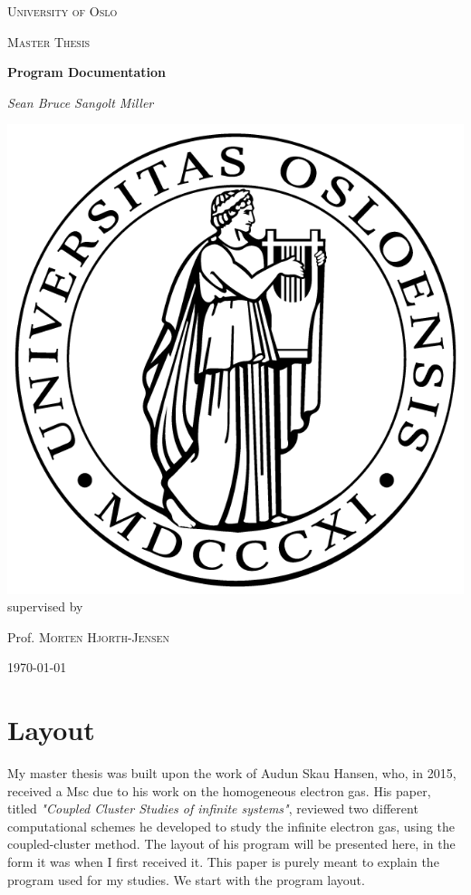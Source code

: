 \documentclass[10pt]{report}
\begin{document}
	
	\begin{titlepage}
		\centering
		{\scshape\LARGE University of Oslo \par}
		\vspace{1cm}
		{\scshape\Large Master Thesis\par}
		\vspace{1.5cm}
		{\huge\bfseries Program Documentation\par}
		\vspace{2cm}
		{\Large\itshape Sean Bruce Sangolt Miller\par}
		\vfill
		\includegraphics*[scale=0.2]{posliten.png}
		\vfill
		supervised by\par
		Prof. \textsc{Morten Hjorth-Jensen}
		
		\vfill
		
		{\large \today\par}
	\end{titlepage}
	
	\chapter{Layout}
	
	My master thesis was built upon the work of Audun Skau Hansen, who, in 2015, received a Msc due to his work on the homogeneous electron gas. His paper, titled \emph{"Coupled Cluster Studies of infinite systems"}, reviewed two different computational schemes he developed to study the infinite electron gas, using the coupled-cluster method. The layout of his program will be presented here, in the form it was when I first received it. This paper is purely meant to explain the program used for my studies. We start with the program layout.
	
\end{document}
